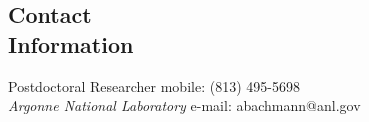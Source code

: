 \documentclass[margin,line]{resume}
\begin{document}
\begin{resume}



    \section{\mysidestyle Contact\\Information}
    Postdoctoral Researcher \hfill mobile: (813) 495-5698 \vspace{0mm}\\\vspace{0mm}%
    \textsl{Argonne National Laboratory} \hfill e-mail: abachmann@anl.gov           \vspace{0mm}\\\vspace{0mm}%
    \vspace{-2mm}\\\vspace{-10mm}%


\end{resume}
\end{document}
